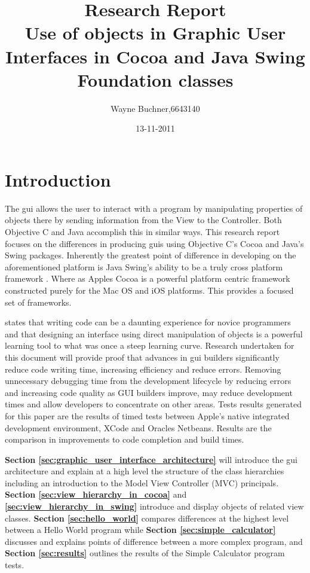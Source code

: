 \documentclass[a4paper,14pt]{article}
\title{Research Report\\Use of objects in Graphic User Interfaces in Cocoa and Java Swing Foundation classes}
\author{Wayne Buchner,6643140}
\date{13-11-2011}
\begin{document}
\ifpdf
{}
\else
{}
\fi

\maketitle
\thispagestyle{empty}
\newpage
\tableofcontents
\newpage

\section{Introduction} %
\label{sec:introduction}
The \gls{gui} allows the user to interact with a program by manipulating properties of objects there by sending information from the View to the Controller. Both Objective C and Java accomplish this in similar ways. This research report focuses on the differences in producing \gls{gui}s using Objective C's Cocoa and Java's Swing packages. Inherently the greatest point of difference in developing on the aforementioned platform is Java Swing's ability to be a truly cross platform framework \cite{nla.cat-vn3060178}. Where as Apples Cocoa is a powerful platform centric framework constructed purely for the Mac OS and iOS platforms. This provides a focused set of frameworks. 

%
 states that writing code can be a daunting experience for novice programmers and that designing an interface using direct manipulation of objects is a powerful learning tool to what was once a steep learning curve. Research undertaken for this document will provide proof that advances in \gls{gui} builders significantly reduce code writing time, increasing efficiency and reduce errors. Removing unnecessary debugging time from the development lifecycle by reducing errors and increasing code quality as GUI builders improve, may reduce development times and allow developers to concentrate on other areas. Tests results generated for this paper are the results of timed tests between Apple's native integrated development environment, XCode and Oracles Netbeans. Results are the comparison in improvements to code completion and build times.  
%

\textbf{Section \ref{sec:graphic_user_interface_architecture}} will introduce the \gls{gui} architecture and explain at a high level the structure of the class hierarchies including an introduction to the Model View Controller (MVC) principals. \textbf{Section \ref{sec:view_hierarchy_in_cocoa}} and \textbf{\ref{sec:view_hierarchy_in_swing}} introduce and display objects of related view classes. \textbf{Section \ref{sec:hello_world}} compares differences at the highest level between a Hello World program while \textbf{Section \ref{sec:simple_calculator}} discusses and explains points of difference between a more complex program, and \textbf{Section \ref{sec:results}} outlines the results of the Simple Calculator program tests.
\end{document}
